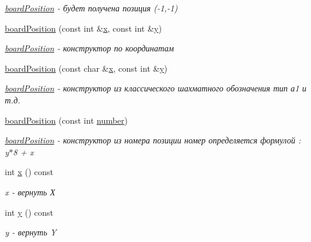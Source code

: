 \begin{DoxyCompactItemize}
\begin{DoxyCompactList}\small\item\em \hyperlink{classboard_position}{board\+Position} -\/ будет получена позиция (-\/1,-\/1) \end{DoxyCompactList}\item 
\hyperlink{classboard_position_a11c22f3e7d236abf022bc927b59ef5a4}{board\+Position} (const int \&\hyperlink{classboard_position_abf254ede46c202864a513b548bf980c3}{x}, const int \&\hyperlink{classboard_position_a189ee18b8ce9691afc7cc4090e929837}{y})
\begin{DoxyCompactList}\small\item\em \hyperlink{classboard_position}{board\+Position} -\/ конструктор по координатам \end{DoxyCompactList}\item 
\hyperlink{classboard_position_ae0d4347de29c13488cd2b275f4f4206a}{board\+Position} (const char \&\hyperlink{classboard_position_abf254ede46c202864a513b548bf980c3}{x}, const int \&\hyperlink{classboard_position_a189ee18b8ce9691afc7cc4090e929837}{y})
\begin{DoxyCompactList}\small\item\em \hyperlink{classboard_position}{board\+Position} -\/ конструктор из классического шахматного обозначения тип а1 и т.\+д. \end{DoxyCompactList}\item 
\hyperlink{classboard_position_a621c395c0d7977a547c803e059cffe73}{board\+Position} (const int \hyperlink{classboard_position_afb83b12885a2ec552cecb067573011d4}{number})
\begin{DoxyCompactList}\small\item\em \hyperlink{classboard_position}{board\+Position} -\/ конструктор из номера позиции номер определяется формулой \+: y$\ast$8 + x \end{DoxyCompactList}\item 
int \hyperlink{classboard_position_abf254ede46c202864a513b548bf980c3}{x} () const 
\begin{DoxyCompactList}\small\item\em x -\/ вернуть Х \end{DoxyCompactList}\item 
int \hyperlink{classboard_position_a189ee18b8ce9691afc7cc4090e929837}{y} () const 
\begin{DoxyCompactList}\small\item\em y -\/ вернуть Y \end{DoxyCompactList}\item 

\end{DoxyCompactItemize}
